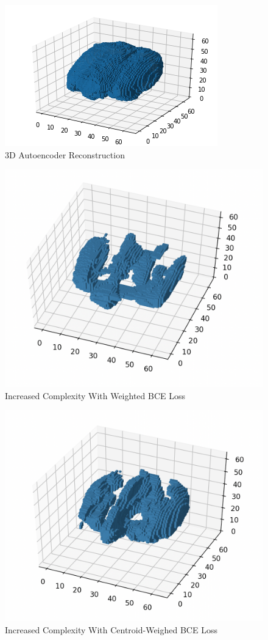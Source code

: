 \documentclass[conference, 10pt]{IEEEtran}
\begin{document}
\begin{figure}[h]
    \centering
    \includegraphics[scale=0.5]{figure_5.png}
    \caption{3D Autoencoder Reconstruction}
\end{figure}
\begin{figure}[h]
    \centering
    \includegraphics[scale=0.2]{add_dropout.png}
    \caption{Increased Complexity With Weighted BCE Loss}
\end{figure}
\begin{figure}[h]
    \centering
    \includegraphics[scale=0.2]{custom_loss.png}
    \caption{Increased Complexity With Centroid-Weighed BCE Loss}
\end{figure}
\end{document}
